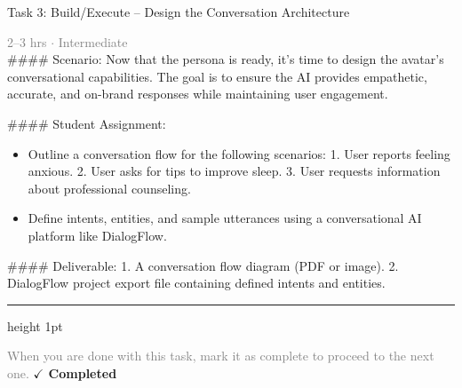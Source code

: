\documentclass[10pt,a4paper]{article}
\begin{document}
\begin{taskbox}{Task 3: Build/Execute – Design the Conversation Architecture}

    {\small \textcolor{gray}{2--3 hrs $\cdot$ Intermediate}}\\[12pt]

    \#\#\#\# Scenario:  
Now that the persona is ready, it’s time to design the avatar’s conversational capabilities. The goal is to ensure the AI provides empathetic, accurate, and on-brand responses while maintaining user engagement.  

\#\#\#\# Student Assignment:  
\begin{itemize}
    \item Outline a conversation flow for the following scenarios:  
  1. User reports feeling anxious.  
  2. User asks for tips to improve sleep.  
  3. User requests information about professional counseling.  
    \item Define intents, entities, and sample utterances using a conversational AI platform like DialogFlow.  
\end{itemize}

\#\#\#\# Deliverable:  
1. A conversation flow diagram (PDF or image).  
2. DialogFlow project export file containing defined intents and entities.\par

    \vspace{16pt}

    \textcolor{cardBorder}{\hrule height 1pt}\vspace{8pt}

    \small \textcolor{gray}{When you are done with this task, mark it as complete to proceed to the next one.} \hfill \textbf{\textcolor{brandDark}{$\checkmark$ Completed}}

\end{taskbox}
\end{document}
